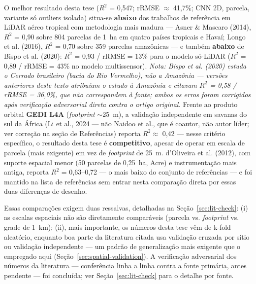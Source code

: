 O melhor resultado desta tese ($R^2$ = 0,547; rRMSE $\approx$ 41,7\%; CNN 2D,
parcela, variante só outliers isolada) situa-se \textbf{abaixo} dos trabalhos de
referência em LiDAR aéreo tropical com metodologia mais madura --- Asner \&
Mascaro (2014), $R^2$ = 0,90 sobre 804 parcelas de 1~ha em quatro países tropicais
e Havaí; Longo et al. (2016), $R^2$ = 0,70 sobre 359 parcelas amazônicas --- e
também \textbf{abaixo} de Bispo et al. (2020): $R^2$ = 0,93 / rRMSE = 13\% para o
modelo só-LiDAR ($R^2$ = 0,89 / rRMSE = 43\% no modelo multissensor). \textit{Nota:
Bispo et al. (2020) estuda o Cerrado brasileiro (bacia do Rio Vermelho), não a
Amazônia --- versões anteriores deste texto atribuíam o estudo à Amazônia e
citavam $R^2$ = 0,58 / rRMSE = 36,0\%, que não correspondem à fonte; ambos os
erros foram corrigidos após verificação adversarial direta contra o artigo
original.} Frente ao produto orbital \textbf{GEDI L4A} (\textit{footprint}
$\sim$25~m), a validação independente em savanas do sul da África (Li et al., 2024
--- não Naidoo et al., que é coautor, não autor líder; ver correção na seção de
Referências) reporta $R^2 \approx$ 0,42 --- nesse critério específico, o resultado
desta tese é \textbf{competitivo}, apesar de operar em escala de parcela (mais
exigente) em vez de \textit{footprint} de 25~m. d'Oliveira et al. (2012), com
suporte espacial menor (50 parcelas de 0,25~ha, Acre) e instrumentação mais
antiga, reporta $R^2$ = 0,63--0,72 --- o mais baixo do conjunto de referências ---
e foi mantido na lista de referências sem entrar nesta comparação direta por essas
duas diferenças de desenho.

Essas comparações exigem duas ressalvas, detalhadas na Seção~\ref{sec:lit-check}:
(i) as escalas espaciais não são diretamente comparáveis (parcela vs.
\textit{footprint} vs. grade de 1~km); (ii), mais importante, os números desta
tese vêm de k-fold aleatório, enquanto boa parte da literatura citada usa
validação cruzada por sítio ou validação independente --- um padrão de
generalização mais exigente que o empregado aqui (Seção~\ref{sec:spatial-validation}).
A verificação adversarial dos números da literatura --- conferência linha a linha
contra a fonte primária, antes pendente --- foi concluída; ver
Seção~\ref{sec:lit-check} para o detalhe por fonte.

